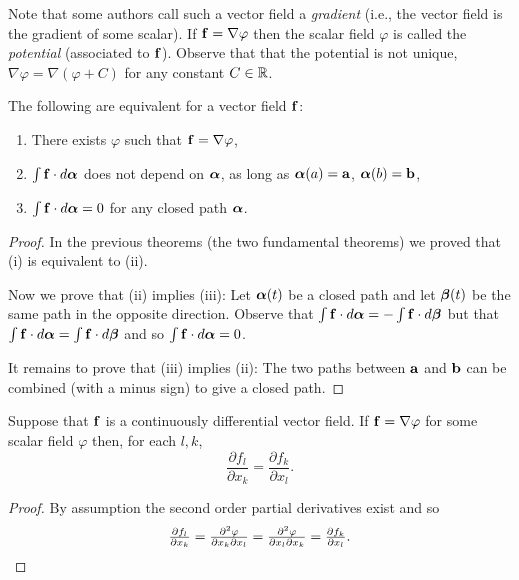 Note that some authors call such a vector field a \emph{gradient} (i.e., the vector field is the gradient of some scalar).
If \(\ff = \nabla \varphi\) then the scalar field \(\varphi\) is called the \emph{potential} (associated to \(\ff\)).
Observe that that the potential is not unique,
\(\nabla \varphi = \nabla(\varphi + C)\) for any constant \(C \in \bR\).


\begin{theorem}
    The following are equivalent for a vector field \(\ff\):
    \begin{enumerate}[label=\textnormal{(\roman*)}]
        \item There exists \(\varphi\) such that \(\ff = \nabla \varphi\),
        \item \(\int \ff \cdot d\aalpha\) does not depend on \(\aalpha\), as long as \(\aalpha(a)=\aa\), \(\aalpha(b)=\bb\),
        \item \(\int \ff \cdot d\aalpha = 0\) for any closed path \(\aalpha\).
    \end{enumerate}
\end{theorem}

\begin{proof}
    In the previous theorems (the two fundamental theorems) we proved that (i) is equivalent to (ii).

    Now we prove that (ii) implies (iii):
    Let \(\aalpha(t)\) be a closed path and let \(\bbeta(t)\) be the same path in the opposite direction. Observe that \(\int \ff \cdot d\aalpha = - \int \ff \cdot d \bbeta\) but that \(\int \ff \cdot d \aalpha = \int \ff \cdot d \bbeta\) and so \(\int \ff \cdot d \aalpha = 0\).

    It remains to prove that (iii) implies (ii): The two paths between \(\aa\) and \(\bb\) can be combined (with a minus sign) to give a closed path.
\end{proof}

\begin{theorem}
    Suppose that \(\ff\) is a continuously differential vector field.
    If \(\ff = \nabla \varphi\) for some scalar field \(\varphi\) then, for each \(l,k\),
    \[
        \frac{\partial f_l}{\partial x_k} = \frac{\partial f_k}{\partial x_l}.
    \]
\end{theorem}

\begin{proof}
    By assumption the second order partial derivatives exist and so
    \[
        \tfrac{\partial f_l}{\partial x_k}
        = \tfrac{\partial^2 \varphi}{\partial x_k \partial x_l}
        = \tfrac{\partial^2 \varphi}{\partial x_l \partial x_k}
        = \tfrac{\partial f_k}{\partial x_l}. \qedhere
    \]
\end{proof}

